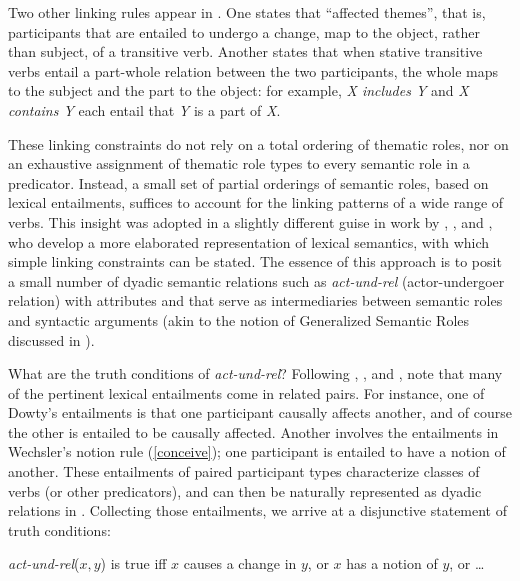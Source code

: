 \documentclass[output=paper
 	        ,biblatex
                ,babelshorthands
                ,newtxmath
                ,draftmode
                ,colorlinks, citecolor=brown
]{langscibook}
\begin{document}
Two other linking rules appear in \citet{Wechsler1995b}.  One states that ``affected themes'', that
is, participants that are entailed to undergo a change, map to the object, rather than subject, of a
transitive verb.  Another states that when stative transitive verbs entail a part-whole relation
between the two participants, the whole maps to the subject and the part to the object: for example,
\textit{X includes Y} and \textit{X contains Y} each entail that \textit{Y} is a part of \textit{X}.

These linking constraints do not rely on a total ordering of thematic roles, nor on an exhaustive
assignment of thematic role types to every semantic role in a predicator. Instead, a small set of
partial orderings of semantic roles, based on lexical entailments, suffices
to account for the linking patterns of a wide range of verbs.  This insight was adopted in a
slightly different guise in work by \citet{Davis1996}, \citet{Davis2001}, and
\citet{DavisandKoenig2000b}, who develop a more elaborated representation of lexical semantics, with
which simple linking constraints can be stated.  The essence of this approach is to posit a small
number of dyadic semantic relations such as \textit{act-und-rel} (actor-undergoer relation) with
attributes  and  that serve as
intermediaries between semantic roles and syntactic arguments (akin to the notion of Generalized
Semantic Roles discussed in \citealt{VanValin1999}).

What are the truth conditions of \textit{act-und-rel}?  Following \citet{Fillmore1977},
\citet{Dowty1991}, and \citet{Wechsler1995b}, \citeauthor{DavisandKoenig2000b} note that many of the pertinent
lexical entailments come in related pairs.  For instance, one of Dowty's entailments is that one
participant causally affects another, and of course the other is entailed to be causally affected.
Another involves the entailments in Wechsler's notion rule (\ref{conceive}); one participant is
entailed to have a notion of another.  These entailments of paired participant types characterize
classes of verbs (or other predicators), and can then be naturally represented as dyadic relations
in .  Collecting those entailments, we arrive at a disjunctive statement of truth
conditions:

\eanoraggedright
\label{def-act-und-rel}
\textit{act-und-rel}($x,y$) is true iff $x$ causes a change in $y$, or $x$ has a notion of $y$, or \ldots
\z
\end{document}
